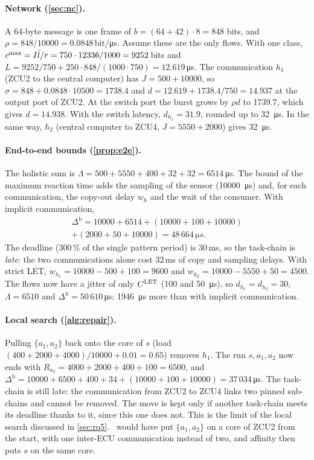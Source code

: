 \paragraph{Network (\cref{sec:nc}).} A 64-byte message is one frame of
$b=(64+42)\cdot8=848$ bits, and $\rho=848/10000=0.0848$\,bit/\si{\micro s}.
Assume these are the only flows. With one class, $c^{\max}=I\bar
l/r=750\cdot12336/1000=9252$\,bits and $L=9252/750+250\cdot848/(1000\cdot
750)=12.619$\,\si{\micro s}. The communication $h_1$ (ZCU2 to the central
computer) has $J=500+10000$, so $\sigma=848+0.0848\cdot10500=1738.4$ and
$d=12.619+1738.4/750=14.937$ at the output port of ZCU2. At the switch port
the burst grows by $\rho d$ to 1739.7, which gives $d=14.938$. With the
switch latency, $d_{h_1}=31.9$, rounded up to \SI{32}{\micro s}. In the same
way, $h_2$ (central computer to ZCU4, $J=5550+2000$) gives
\SI{32}{\micro s}.

\paragraph{End-to-end bounds (\cref{prop:e2e}).} The holistic sum is
$\Lambda=500+5550+400+32+32=6514$\,\si{\micro s}. The bound of the maximum
reaction time adds the sampling of the sensor (\SI{10000}{\micro s}) and,
for each communication, the copy-out delay $w_h$ and the wait of the
consumer. With implicit communication,
\begin{multline*}
\Delta^{\mathrm b}=10000+6514+(10000+100+10000)\\+(2000+50+10000)
=48\,664\,\si{\micro s}.
\end{multline*}
The deadline (300\,\% of the single pattern period) is 30\,ms, so the
task-chain is \emph{late}: the two communications alone cost 32\,ms of
copy and sampling delays. With strict LET, $w_{h_1}=10000-500+100=9600$
and $w_{h_2}=10000-5550+50=4500$. The flows now have a jitter of only
$C^{\mathrm{LET}}$ (100 and \SI{50}{\micro s}), so $d_{h_1}=d_{h_2}=30$,
$\Lambda=6510$ and $\Delta^{\mathrm b}=50\,610$\,\si{\micro s}:
\SI{1946}{\micro s} more than with implicit communication.

\paragraph{Local search (\cref{alg:repair}).} Pulling $\{a_1,a_2\}$ back
onto the core of $s$ (load $(400+2000+4000)/10000+0.01=0.65$) removes $h_1$.
The run $s,a_1,a_2$ now ends with $R_{a_2}=4000+2000+400+100=6500$, and
$\Delta^{\mathrm b}=10000+6500+400+34+(10000+100+10000)=37\,034$\,\si{\micro s}. The
task-chain is still late: the communication from ZCU2 to ZCU4 links two
pinned sub-chains and cannot be removed. The move is kept only if another
task-chain meets its deadline thanks to it, since this one does not. This
is the limit of the local search discussed in \cref{sec:rq5}. \CADU\ would
have put $\{a_1,a_2\}$ on a core of ZCU2 from the start, with one
inter-ECU communication instead of two, and affinity then puts $s$ on the
same core.
